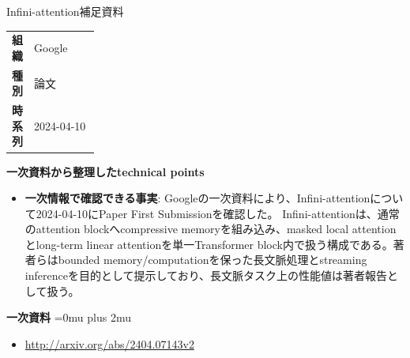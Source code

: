 \begin{technicalnote}{Infini-attention}{補足資料}
\begingroup
\begin{tabularx}{\linewidth}{@{}>{\bfseries}p{0.22\linewidth}X@{}}
組織 & Google \\
種別 & 論文 \\
時系列 & 2024-04-10 \\
\end{tabularx}
\smallskip
\begin{minipage}{\linewidth}
{\bfseries 一次資料から整理したtechnical points}
\begin{itemize}[leftmargin=1.5em,itemsep=0.35em]
\item \textbf{一次情報で確認できる事実}: Googleの一次資料により、Infini-attentionについて2024-04-10にPaper First Submissionを確認した。 Infini-attentionは、通常のattention blockへcompressive memoryを組み込み、masked local attentionとlong-term linear attentionを単一Transformer block内で扱う構成である。著者らはbounded memory/computationを保った長文脈処理とstreaming inferenceを目的として提示しており、長文脈タスク上の性能値は著者報告として扱う。
\end{itemize}
\begin{minipage}{\linewidth}
\begin{samepage}
{\bfseries 一次資料}
\begingroup\sloppy
\Urlmuskip=0mu plus 2mu\relax
\begin{itemize}[leftmargin=1.5em,itemsep=0.25em]
\item {\scriptsize\url{http://arxiv.org/abs/2404.07143v2}}
\end{itemize}
\endgroup
\end{samepage}
\end{minipage}
\end{minipage}
\endgroup
\end{technicalnote}
\medskip

